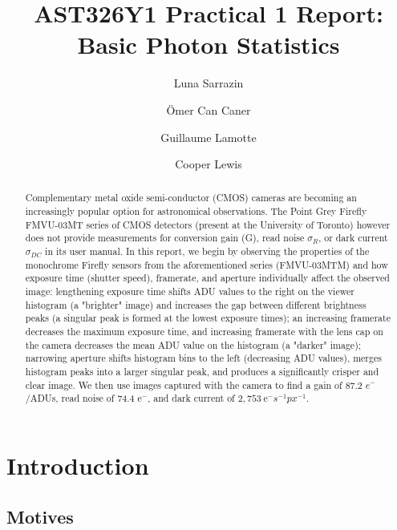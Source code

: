 \documentclass[preprint2]{aastex702}
\begin{document}
\title{AST326Y1 Practical 1 Report: Basic Photon Statistics}

\author{Luna Sarrazin}

\author{Ömer Can Caner}

\author{Guillaume Lamotte}

\author{Cooper Lewis}

	\begin{abstract}
        Complementary metal oxide semi-conductor (CMOS) cameras are becoming an increasingly popular option for astronomical observations. The Point Grey Firefly FMVU-03MT series of CMOS detectors (present at the University of Toronto) however does not provide measurements for conversion gain (G), read noise $\sigma_R$, or dark current $\sigma_{DC}$ in its user manual. In this report, we begin by observing the properties of the monochrome Firefly sensors from the aforementioned series (FMVU-03MTM) and how exposure time (shutter speed), framerate, and aperture individually affect the observed image: lengthening exposure time shifts ADU values to the right on the viewer histogram (a "brighter" image) and increases the gap between different brightness peaks (a singular peak is formed at the lowest exposure times); an increasing framerate decreases the maximum exposure time, and increasing framerate with the lens cap on the camera decreases the mean ADU value on the histogram (a "darker" image); narrowing aperture shifts histogram bins to the left (decreasing ADU values), merges histogram peaks into a larger singular peak, and produces a significantly crisper and clear image. We then use images captured with the camera to find a gain of 87.2 $e^-$/ADUs, read noise of 74.4 e$^-$, and dark current of $2,753  \ \text{e}^-s^{-1}px^{-1}$.
	\end{abstract}

	\section{Introduction}\label{sec:intro}

		\subsection{Motives}\label{ssec:motives}
\end{document}
